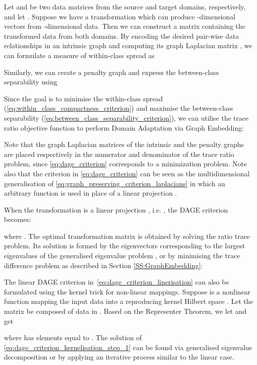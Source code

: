 \documentclass[journal]{IEEEtran}
\begin{document}
Let  and  be two data matrices from the source and target domains, respectively, and let . Suppose we have a transformation  which can produce -dimensional vectors from -dimensional data. Then we can construct a matrix  containing the transformed data from both domains. By encoding the desired pair-wise data relationships in an intrinsic graph  and computing its graph Laplacian matrix , we can formulate a measure of within-class spread as

Similarly, we can create a penalty graph  and express the between-class separability using


Since the goal is to minimise the within-class spread (\cref{eq:within_class_compactness_criterion}) and maximise the between-class separability (\cref{eq:between_class_separability_criterion}), we can utilise the trace ratio objective function to perform Domain Adaptation via Graph Embedding:

Note that the graph Laplacian matrices of the intrinsic and the penalty graphs are placed respectively in the numerator and denominator of the trace ratio problem, since \cref{eq:dage_criterion} corresponds to a minimization problem. 
Note also that the criterion in \cref{eq:dage_criterion} can be seen as the multidimensional generalisation of \cref{eq:graph_preserving_criterion_laplacians} in which an arbitrary function  is used in place of a linear projection .


When the transformation is a linear projection , i.e. , the DAGE criterion becomes:

where . The optimal transformation matrix  is obtained by solving the ratio trace problem. Its solution is formed by the eigenvectors corresponding to the  largest eigenvalues of the generalised eigenvalue problem , or by minimising the trace difference problem as described in Section \ref{SS:GraphEmbedding}:



The linear DAGE criterion in~\cref{eq:dage_criterion_linerisation} can also be formulated using the kernel trick for non-linear mappings. Suppose  is a nonlinear function mapping the input data into a reproducing kernel Hilbert space . Let the matrix  be composed of data in . Based on the Representer Theorem, we let  and get

where  has elements equal to . The solution of \cref{eq:dage_criterion_kernelisation_step_1} can be found via generalised eigenvalue decomposition or by applying an iterative process similar to the linear case.
\end{document}

